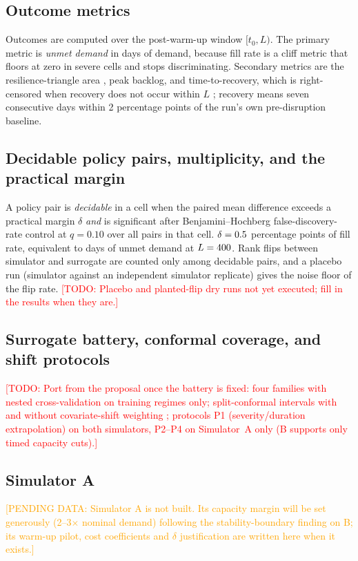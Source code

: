 \documentclass[11pt,a4paper]{article}
\newcommand{\todo}[1]{\textcolor{red}{[TODO: #1]}}
\newcommand{\pending}[1]{\textcolor{orange}{[PENDING DATA: #1]}}
\begin{document}
\subsection{Outcome metrics}
Outcomes are computed over the post-warm-up window $[t_0, L)$. The primary metric is \emph{unmet demand} in days of demand, because fill rate is a cliff metric that floors at zero in severe cells and stops discriminating. Secondary metrics are the resilience-triangle area \citep{bruneau2003}, peak backlog, and time-to-recovery, which is right-censored when recovery does not occur within $L$ \citep{henry2012}; recovery means seven consecutive days within 2 percentage points of the run's own pre-disruption baseline.

\subsection{Decidable policy pairs, multiplicity, and the practical margin}\label{sec:decidable}
A policy pair is \emph{decidable} in a cell when the paired mean difference exceeds a practical margin $\delta$ \emph{and} is significant after Benjamini--Hochberg false-discovery-rate control at $q=0.10$ \citep{benjamini1995} over all pairs in that cell. $\delta=0.5$ percentage points of fill rate, equivalent to \DeltaUnmet{} days of unmet demand at $L=400$. Rank flips between simulator and surrogate are counted only among decidable pairs, and a placebo run (simulator against an independent simulator replicate) gives the noise floor of the flip rate. \todo{Placebo and planted-flip dry runs not yet executed; fill in the results when they are.}

\subsection{Surrogate battery, conformal coverage, and shift protocols}
\todo{Port from the proposal once the battery is fixed: four families with nested cross-validation on training regimes only; split-conformal intervals with and without covariate-shift weighting \citep{tibshirani2019}; protocols P1 (severity/duration extrapolation) on both simulators, P2--P4 on Simulator~A only (B supports only timed capacity cuts).}

\subsection{Simulator A}\label{sec:simA}
\pending{Simulator A is not built. Its capacity margin will be set generously (2--3$\times$ nominal demand) following the stability-boundary finding on B; its warm-up pilot, cost coefficients and $\delta$ justification are written here when it exists.}
\end{document}
